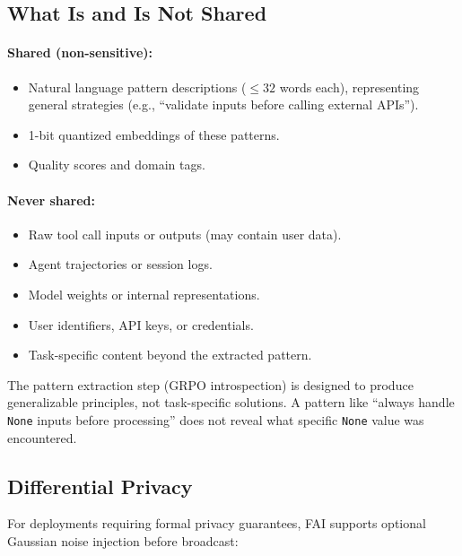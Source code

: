 \documentclass[11pt]{article}
\begin{document}
\subsection{What Is and Is Not Shared}

\paragraph{Shared (non-sensitive):}
\begin{itemize}[leftmargin=1.5em]
    \item Natural language pattern descriptions ($\leq 32$ words each),
          representing general strategies (e.g., ``validate inputs before
          calling external APIs'').
    \item 1-bit quantized embeddings of these patterns.
    \item Quality scores and domain tags.
\end{itemize}

\paragraph{Never shared:}
\begin{itemize}[leftmargin=1.5em]
    \item Raw tool call inputs or outputs (may contain user data).
    \item Agent trajectories or session logs.
    \item Model weights or internal representations.
    \item User identifiers, API keys, or credentials.
    \item Task-specific content beyond the extracted pattern.
\end{itemize}

The pattern extraction step (GRPO introspection) is designed to produce
generalizable principles, not task-specific solutions. A pattern like
``always handle \texttt{None} inputs before processing'' does not reveal
what specific \texttt{None} value was encountered.

\subsection{Differential Privacy}

For deployments requiring formal privacy guarantees, FAI supports optional
Gaussian noise injection before broadcast:
\end{document}
